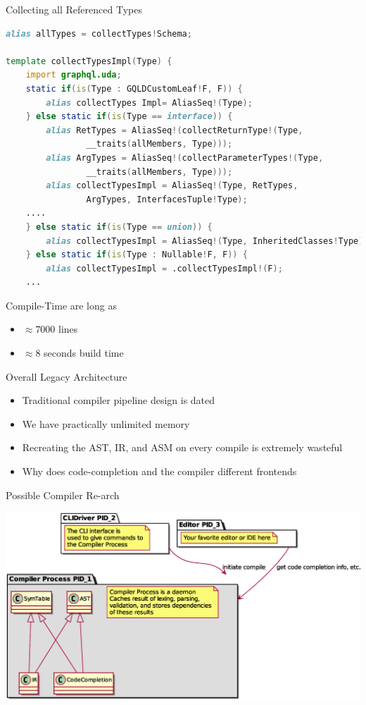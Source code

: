 \documentclass[aspectratio=169,notes]{beamer}
\begin{document}
	\begin{frame}[fragile]{Collecting all Referenced Types}
\begin{lstlisting}[language=D,basicstyle=\scriptsize\ttfamily]
alias allTypes = collectTypes!Schema;

template collectTypesImpl(Type) {
	import graphql.uda;
	static if(is(Type : GQLDCustomLeaf!F, F)) {
		alias collectTypes Impl= AliasSeq!(Type);
	} else static if(is(Type == interface)) {
		alias RetTypes = AliasSeq!(collectReturnType!(Type,
				__traits(allMembers, Type)));
		alias ArgTypes = AliasSeq!(collectParameterTypes!(Type,
				__traits(allMembers, Type)));
		alias collectTypesImpl = AliasSeq!(Type, RetTypes, 
				ArgTypes, InterfacesTuple!Type);
	....
	} else static if(is(Type == union)) {
		alias collectTypesImpl = AliasSeq!(Type, InheritedClasses!Type);
	} else static if(is(Type : Nullable!F, F)) {
		alias collectTypesImpl = .collectTypesImpl!(F);
	...
\end{lstlisting}
	\end{frame}

	\begin{frame}[fragile]{Compile-Time are long as}
		\Large
		\begin{itemize}
			\item $\approx{} 7000$ lines
			\item $\approx{} 8$ seconds build time
		\end{itemize}
	\end{frame}

	\begin{frame}[fragile]{Overall Legacy Architecture}
		\Large
		\begin{itemize}
			\item Traditional compiler pipeline design is dated
				\pause
			\item We have practically unlimited memory
			\item Recreating the AST, IR, and ASM on every compile is extremely wasteful
			\item Why does code-completion and the compiler different frontends
		\end{itemize}
	\end{frame}

	\begin{frame}{Possible Compiler Re-arch}
		\begin{center}
		\includegraphics[height=0.9\textheight]{rearch.eps}
		\end{center}
	\end{frame}
\end{document}
